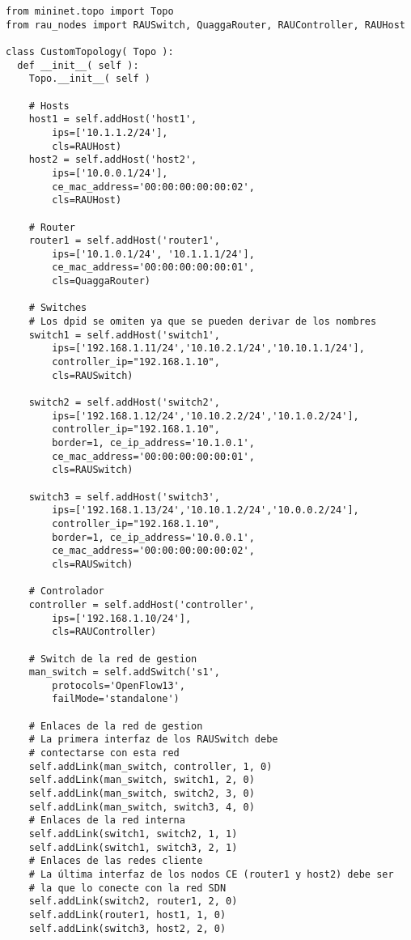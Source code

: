 \begin{verbatim}
from mininet.topo import Topo
from rau_nodes import RAUSwitch, QuaggaRouter, RAUController, RAUHost

class CustomTopology( Topo ):
  def __init__( self ):
	Topo.__init__( self )

	# Hosts
	host1 = self.addHost('host1',
		ips=['10.1.1.2/24'],
		cls=RAUHost)
	host2 = self.addHost('host2',
		ips=['10.0.0.1/24'],
		ce_mac_address='00:00:00:00:00:02',
		cls=RAUHost)
	
	# Router	
	router1 = self.addHost('router1',
		ips=['10.1.0.1/24', '10.1.1.1/24'],
		ce_mac_address='00:00:00:00:00:01',
		cls=QuaggaRouter)
		
	# Switches
	# Los dpid se omiten ya que se pueden derivar de los nombres
	switch1 = self.addHost('switch1',
		ips=['192.168.1.11/24','10.10.2.1/24','10.10.1.1/24'],
		controller_ip="192.168.1.10",
		cls=RAUSwitch)

	switch2 = self.addHost('switch2',
		ips=['192.168.1.12/24','10.10.2.2/24','10.1.0.2/24'],
		controller_ip="192.168.1.10",
		border=1, ce_ip_address='10.1.0.1',
		ce_mac_address='00:00:00:00:00:01',
		cls=RAUSwitch)
		
	switch3 = self.addHost('switch3',
		ips=['192.168.1.13/24','10.10.1.2/24','10.0.0.2/24'],
		controller_ip="192.168.1.10",
		border=1, ce_ip_address='10.0.0.1',
		ce_mac_address='00:00:00:00:00:02',
		cls=RAUSwitch)
		
	# Controlador
	controller = self.addHost('controller',
		ips=['192.168.1.10/24'],
		cls=RAUController)
		
	# Switch de la red de gestion
	man_switch = self.addSwitch('s1',
		protocols='OpenFlow13',
		failMode='standalone')
		
	# Enlaces de la red de gestion
	# La primera interfaz de los RAUSwitch debe
	# contectarse con esta red
	self.addLink(man_switch, controller, 1, 0)
	self.addLink(man_switch, switch1, 2, 0)
	self.addLink(man_switch, switch2, 3, 0)
	self.addLink(man_switch, switch3, 4, 0)
	# Enlaces de la red interna
	self.addLink(switch1, switch2, 1, 1)
	self.addLink(switch1, switch3, 2, 1)
	# Enlaces de las redes cliente
	# La última interfaz de los nodos CE (router1 y host2) debe ser
	# la que lo conecte con la red SDN
	self.addLink(switch2, router1, 2, 0)
	self.addLink(router1, host1, 1, 0)	
	self.addLink(switch3, host2, 2, 0)
\end{verbatim}


